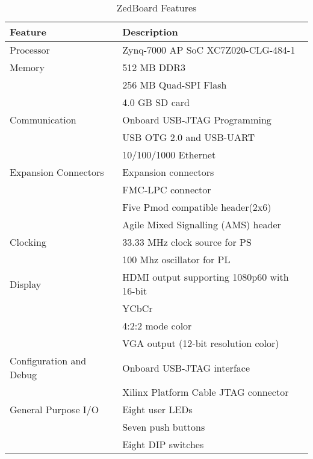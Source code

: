 \begin{table}[htbp]
	\centering
	\begin{adjustbox}{width=.6\textwidth}
		\small
	
	\begin{tabular}{rl}
		\toprule
		\multicolumn{1}{l}{\textbf{Feature }} & \textbf{Description} \\
		\midrule
	    \multicolumn{1}{l}{Processor } & Zynq-7000 AP SoC XC7Z020-CLG-484-1 \\
		\midrule
	    \multicolumn{1}{l}{Memory } & 512 MB DDR3 \\
	      & 256 MB Quad-SPI Flash \\
	      & 4.0 GB SD card \\
		\midrule
	    \multicolumn{1}{l}{Communication} & Onboard USB-JTAG Programming \\
	      & USB OTG 2.0 and USB-UART \\
	      & 10/100/1000 Ethernet \\
		\midrule
	    \multicolumn{1}{l}{Expansion Connectors} & Expansion connectors  \\
	      & FMC-LPC connector  \\
	      & Five Pmod compatible header(2x6) \\
	      & Agile Mixed Signalling (AMS) header \\
		\midrule
	    \multicolumn{1}{l}{Clocking } & 33.33 MHz clock source for PS \\
	      & 100 Mhz oscillator for PL  \\
		\midrule
	    \multicolumn{1}{l}{Display } & HDMI output supporting 1080p60 with 16-bit \\
	      & YCbCr \\
	      & 4:2:2 mode color  \\
	      & VGA output (12-bit resolution color) \\
		\midrule
	    \multicolumn{1}{l}{Configuration and Debug} & Onboard USB-JTAG interface \\
	      & Xilinx Platform Cable JTAG connector \\
		\midrule
	    \multicolumn{1}{l}{General Purpose I/O} & Eight user LEDs  \\
	      & Seven push buttons \\
	      & Eight DIP switches \\
		\bottomrule	
	\end{tabular}%
    \end{adjustbox}
  \caption{ZedBoard Features}
  \label{zz:123}%
   \end{table}%